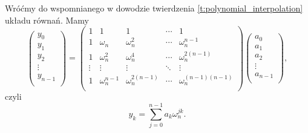 \documentclass[11pt]{scrartcl}
\begin{document}
    Wróćmy do wspomnianego w dowodzie twierdzenia \ref{t:polynomial_interpolation} układu równań. Mamy
    \begin{equation*}
        \begin{pmatrix}
            y_0 \\
            y_1 \\
            y_2 \\
            \vdots \\
            y_{n-1} \\
        \end{pmatrix}
        =
        \begin{pmatrix}
            1 & 1 & 1 & \cdots & 1 \\
            1 & \omega_n & \omega_n^2 & \cdots & \omega_n^{n-1} \\
            1 & \omega_n^2 & \omega_n^4  & \cdots & \omega_n^{2(n-1)} \\
            \vdots & \vdots  & \vdots & \ddots & \vdots    \\
            1 & \omega_n^{n-1} & \omega_n^{2(n-1)}  & \cdots & \omega_n^{(n-1)(n-1)} \\
        \end{pmatrix}
        \begin{pmatrix}
            a_0 \\
            a_1 \\
            a_2 \\
            \vdots \\
            a_{n-1} \\
        \end{pmatrix},
    \end{equation*}
    czyli
    \begin{equation}
        \label{eq:y_k}
        y_k = \sum_{j=0}^{n-1} a_k\omega_n^{jk}.
    \end{equation}
\end{document}
